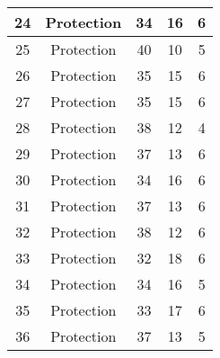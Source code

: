 \documentclass[results.tex]{subfiles}
\begin{document}
\begin{center}
\begin{tabular}{| c || c | c | c | c |}
            \hline
            24                      & Protection                   & 34                     & 16                      & 6                    \\
            \hline
            25                      & Protection                   & 40                     & 10                      & 5                    \\
            \hline
            26                      & Protection                   & 35                     & 15                      & 6                    \\
            \hline
            27                      & Protection                   & 35                     & 15                      & 6                    \\
            \hline
            28                      & Protection                   & 38                     & 12                      & 4                    \\
            \hline
            29                      & Protection                   & 37                     & 13                      & 6                    \\
            \hline
            30                      & Protection                   & 34                     & 16                      & 6                    \\
            \hline
            31                      & Protection                   & 37                     & 13                      & 6                    \\
            \hline
            32                      & Protection                   & 38                     & 12                      & 6                    \\
            \hline
            33                      & Protection                   & 32                     & 18                      & 6                    \\
            \hline
            34                      & Protection                   & 34                     & 16                      & 5                    \\
            \hline
            35                      & Protection                   & 33                     & 17                      & 6                    \\
            \hline
            36                      & Protection                   & 37                     & 13                      & 5                    \\

\end{tabular}
\end{center}
\end{document}

